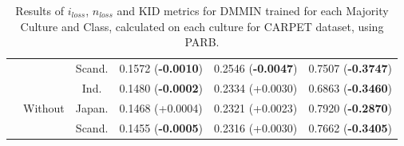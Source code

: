 \begin{table}[H]
\begin{tabular}{c|c|c|c|c|c}
 &  & Scand. & 0.1572 (\textbf{-0.0010})       & 0.2546 (\textbf{-0.0047})       & 0.7507 (\textbf{-0.3747})   \\
\hhline{~-----}
 & \multirow{3}{*}{Without} &Ind.     & 0.1480 (\textbf{-0.0002})       & 0.2334 (+0.0030)       & 0.6863 (\textbf{-0.3460})   \\
 &  & Japan.   & 0.1468 (+0.0004)       & 0.2321 (+0.0023)       & 0.7920 (\textbf{-0.2870})  \\
 &  & Scand. & 0.1455 (\textbf{-0.0005})       & 0.2316 (+0.0030)       & 0.7662 (\textbf{-0.3405}) \\  
\bottomrule
    \end{tabular}
    \caption{Results of $i_{loss}$, $n_{loss}$ and KID metrics for DMMIN trained for each Majority Culture and Class, calculated on each culture for CARPET dataset, using PARB.}
    \label{ch3:tab:ris:dmmin:parb:carpet}
\end{table}


